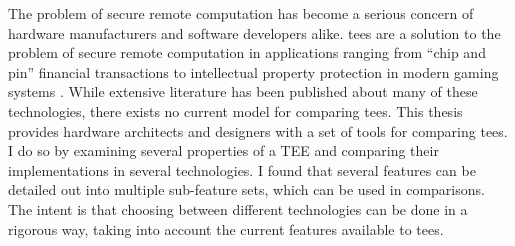 The problem of secure remote computation has become a serious concern of hardware manufacturers and software developers alike. \glspl{tee} are a solution to the problem of secure remote computation in applications ranging from ``chip and pin'' financial transactions \cite{679731} to intellectual property protection in modern gaming systems \cite{da2018securing}. While extensive literature has been published about many of these technologies, there exists no current model for comparing \glspl{tee}. This thesis provides hardware architects and designers with a set of tools for comparing \glspl{tee}. I do so by examining several properties of a TEE and comparing their implementations in several technologies. I found that several features can be detailed out into multiple sub-feature sets, which can be used in comparisons. The intent is that choosing between different technologies can be done in a rigorous way, taking into account the current features available to \glspl{tee}.